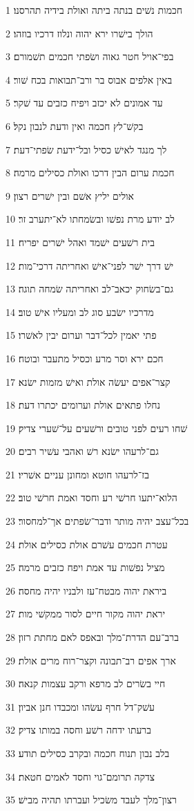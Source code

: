 \par 1 חכמות נשׁים בנתה ביתה ואולת בידיה תהרסנו׃
\par 2 הולך בישׁרו ירא יהוה ונלוז דרכיו בוזהו׃
\par 3 בפי־אויל חטר גאוה ושׂפתי חכמים תשׁמורם׃
\par 4 באין אלפים אבוס בר ורב־תבואות בכח שׁור׃
\par 5 עד אמונים לא יכזב ויפיח כזבים עד שׁקר׃
\par 6 בקשׁ־לץ חכמה ואין ודעת לנבון נקל׃
\par 7 לך מנגד לאישׁ כסיל ובל־ידעת שׂפתי־דעת׃
\par 8 חכמת ערום הבין דרכו ואולת כסילים מרמה׃
\par 9 אולים יליץ אשׁם ובין ישׁרים רצון׃
\par 10 לב יודע מרת נפשׁו ובשׂמחתו לא־יתערב זר׃
\par 11 בית רשׁעים ישׁמד ואהל ישׁרים יפריח׃
\par 12 ישׁ דרך ישׁר לפני־אישׁ ואחריתה דרכי־מות׃
\par 13 גם־בשׂחוק יכאב־לב ואחריתה שׂמחה תוגה׃
\par 14 מדרכיו ישׂבע סוג לב ומעליו אישׁ טוב׃
\par 15 פתי יאמין לכל־דבר וערום יבין לאשׁרו׃
\par 16 חכם ירא וסר מרע וכסיל מתעבר ובוטח׃
\par 17 קצר־אפים יעשׂה אולת ואישׁ מזמות ישׂנא׃
\par 18 נחלו פתאים אולת וערומים יכתרו דעת׃
\par 19 שׁחו רעים לפני טובים ורשׁעים על־שׁערי צדיק׃
\par 20 גם־לרעהו ישׂנא רשׁ ואהבי עשׁיר רבים׃
\par 21 בז־לרעהו חוטא ומחונן עניים אשׁריו׃
\par 22 הלוא־יתעו חרשׁי רע וחסד ואמת חרשׁי טוב׃
\par 23 בכל־עצב יהיה מותר ודבר־שׂפתים אך־למחסור׃
\par 24 עטרת חכמים עשׁרם אולת כסילים אולת׃
\par 25 מציל נפשׁות עד אמת ויפח כזבים מרמה׃
\par 26 ביראת יהוה מבטח־עז ולבניו יהיה מחסה׃
\par 27 יראת יהוה מקור חיים לסור ממקשׁי מות׃
\par 28 ברב־עם הדרת־מלך ובאפס לאם מחתת רזון׃
\par 29 ארך אפים רב־תבונה וקצר־רוח מרים אולת׃
\par 30 חיי בשׂרים לב מרפא ורקב עצמות קנאה׃
\par 31 עשׁק־דל חרף עשׂהו ומכבדו חנן אביון׃
\par 32 ברעתו ידחה רשׁע וחסה במותו צדיק׃
\par 33 בלב נבון תנוח חכמה ובקרב כסילים תודע׃
\par 34 צדקה תרומם־גוי וחסד לאמים חטאת׃
\par 35 רצון־מלך לעבד משׂכיל ועברתו תהיה מבישׁ׃

